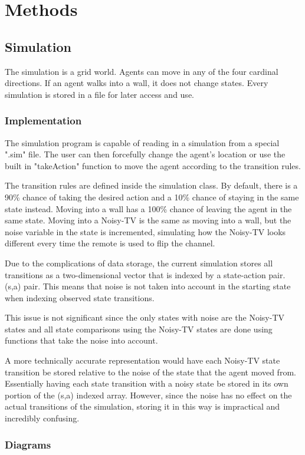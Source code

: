 \documentclass[12pt]{thesis}
\begin{document}
\chapter{Methods}
\section{Simulation}
The simulation is a grid world. Agents can move in any of the four cardinal directions. If an agent walks into a wall, it does not change states. Every simulation is stored in a file for later access and use.
\subsection{Implementation}
The simulation program is capable of reading in a simulation from a special ".sim" file. The user can then forcefully change the agent's location or use the built in "takeAction" function to move the agent according to the transition rules.

The transition rules are defined inside the simulation class. By default, there is a 90\% chance of taking the desired action and a 10\% chance of staying in the same state instead. Moving into a wall has a 100\% chance of leaving the agent in the same state. Moving into a Noisy-TV is the same as moving into a wall, but the noise variable in the state is incremented, simulating how the Noisy-TV looks different every time the remote is used to flip the channel.

Due to the complications of data storage, the current simulation stores all transitions as a two-dimensional vector that is indexed by a state-action pair. (s,a) pair. This means that noise is not taken into account in the starting state when indexing observed state transitions.

This issue is not significant since the only states with noise are the Noisy-TV states and all state comparisons using the Noisy-TV states are done using functions that take the noise into account.

A more technically accurate representation would have each Noisy-TV state transition be stored relative to the noise of the state that the agent moved from. Essentially having each state transition with a noisy state be stored in its own portion of the (s,a) indexed array. However, since the noise has no effect on the actual transitions of the simulation, storing it in this way is impractical and incredibly confusing.

\subsection{Diagrams}
\end{document}
